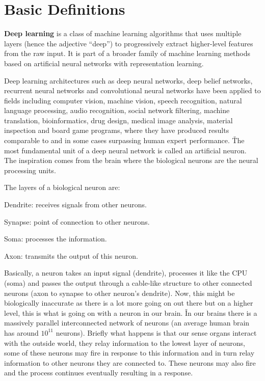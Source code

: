 \section{Basic Definitions}

\textbf{Deep learning} is a class of machine learning algorithms that uses multiple layers (hence the adjective
``deep'') to progressively extract higher-level features from the raw input. It is part of a broader family of
machine learning methods based on artificial neural networks with representation learning.
\ed

Deep learning architectures such as deep neural networks, deep belief networks, recurrent neural networks and
convolutional neural networks have been applied to fields including computer vision, machine vision, speech
recognition, natural language processing, audio recognition, social network filtering, machine translation,
bioinformatics, drug design, medical image analysis, material inspection and board game programs, where they have
produced results comparable to and in some cases surpassing human expert performance. \v

The most fundamental unit of a deep neural network is called an artificial neuron. The inspiration comes from the
brain where the biological neurons are the neural processing units.


The layers of a biological neuron are:
\bit
\item Dendrite: receives signals from other neurons.
\item Synapse: point of connection to other neurons.
\item Soma: processes the information.
\item Axon: transmits the output of this neuron.
\eit

Basically, a neuron takes an input signal (dendrite), processes it like the CPU (soma) and passes the output through
a cable-like structure to other connected neurons (axon to synapse to other neuron's dendrite). Now, this might be
biologically inaccurate as there is a lot more going on out there but on a higher level, this is what is going on
with a neuron in our brain. \v

In our brains there is a massively parallel interconnected network of neurons (an average human brain has around
$10^{11}$ neurons). Briefly what happens is that our sense organs interact with the outside world, they relay
information to the lowest layer of neurons, some of these neurons may fire in response to this information and in
turn relay information to other neurons they are connected to. These neurons may also fire and the process continues
eventually resulting in a response.

